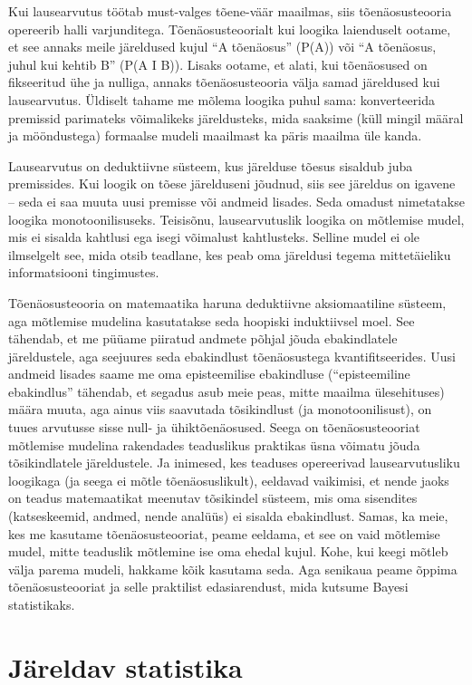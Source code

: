 \documentclass[]{book}
\begin{document}
Kui lausearvutus töötab must-valges tõene-väär maailmas, siis tõenäosusteooria opereerib halli varjunditega. Tõenäosusteoorialt kui loogika laienduselt ootame, et see annaks meile järeldused kujul ``A tõenäosus'' (P(A)) või ``A tõenäosus, juhul kui kehtib B'' (P(A I B)). Lisaks ootame, et alati, kui tõenäosused on fikseeritud ühe ja nulliga, annaks tõenäosusteooria välja samad järeldused kui lausearvutus. Üldiselt tahame me mõlema loogika puhul sama: konverteerida premissid parimateks võimalikeks järeldusteks, mida saaksime (küll mingil määral ja mööndustega) formaalse mudeli maailmast ka päris maailma üle kanda.

Lausearvutus on deduktiivne süsteem, kus järelduse tõesus sisaldub juba premissides. Kui loogik on tõese järelduseni jõudnud, siis see järeldus on igavene -- seda ei saa muuta uusi premisse või andmeid lisades. Seda omadust nimetatakse loogika monotoonilisuseks. Teisisõnu, lausearvutuslik loogika on mõtlemise mudel, mis ei sisalda kahtlusi ega isegi võimalust kahtlusteks. Selline mudel ei ole ilmselgelt see, mida otsib teadlane, kes peab oma järeldusi tegema mittetäieliku informatsiooni tingimustes.

Tõenäosusteooria on matemaatika haruna deduktiivne aksiomaatiline süsteem, aga mõtlemise mudelina kasutatakse seda hoopiski induktiivsel moel. See tähendab, et me püüame piiratud andmete põhjal jõuda ebakindlatele järeldustele, aga seejuures seda ebakindlust tõenäosustega kvantifitseerides. Uusi andmeid lisades saame me oma episteemilise ebakindluse (``episteemiline ebakindlus'' tähendab, et segadus asub meie peas, mitte maailma ülesehituses) määra muuta, aga ainus viis saavutada tõsikindlust (ja monotoonilisust), on tuues arvutusse sisse null- ja ühiktõenäosused. Seega on tõenäosusteooriat mõtlemise mudelina rakendades teaduslikus praktikas üsna võimatu jõuda tõsikindlatele järeldustele. Ja inimesed, kes teaduses opereerivad lausearvutusliku loogikaga (ja seega ei mõtle tõenäosuslikult), eeldavad vaikimisi, et nende jaoks on teadus matemaatikat meenutav tõsikindel süsteem, mis oma sisendites (katseskeemid, andmed, nende analüüs) ei sisalda ebakindlust. Samas, ka meie, kes me kasutame tõenäosusteooriat, peame eeldama, et see on vaid mõtlemise mudel, mitte teaduslik mõtlemine ise oma ehedal kujul. Kohe, kui keegi mõtleb välja parema mudeli, hakkame kõik kasutama seda. Aga senikaua peame õppima tõenäosusteooriat ja selle praktilist edasiarendust, mida kutsume Bayesi statistikaks.

\hypertarget{jareldav-statistika}{%
\chapter{Järeldav statistika}\label{jareldav-statistika}}
\end{document}
